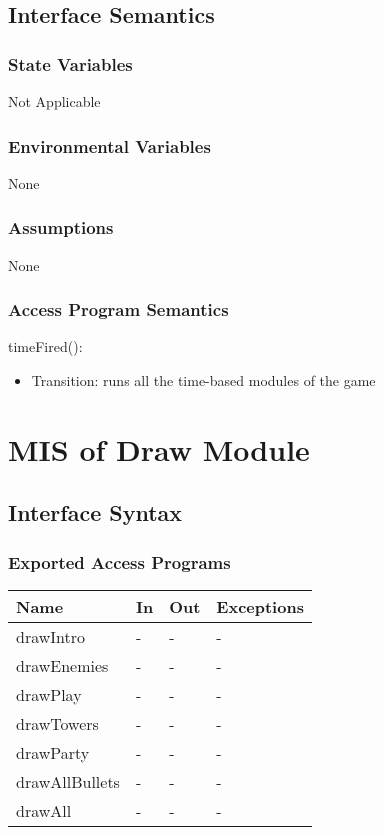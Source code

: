 \documentclass[12,english]{article}
\begin{document}
\subsection{Interface Semantics}
\subsubsection{State Variables}
Not Applicable 
\subsubsection{Environmental Variables}
None
\subsubsection{Assumptions}
None
\subsubsection{Access Program Semantics}

\noindent timeFired():
\begin{itemize}
    \item Transition: runs all the time-based modules of the game
\end{itemize}

\section{MIS of Draw Module}
\subsection{Interface Syntax}
\subsubsection{Exported Access Programs}
\begin{table}[h!]
    \centering
    \begin{tabular}{|p{4cm}|p{2cm}|p{2cm}|p{2cm}|}
    \hline
    \textbf {Name}  & {In} & {Out} & {Exceptions} \\
    \hline
    drawIntro & - & - & -\\
    \hline 
    drawEnemies & - & - & -\\
    \hline 
    drawPlay & - & - & -\\
    \hline 
    drawTowers & - & - & -\\
    \hline 
    drawParty & - & - & -\\
    \hline 
    drawAllBullets & - & - & -\\
    \hline 
    drawAll & - & - & -\\
    \hline 
    \end{tabular}
\end{table}
\end{document}
